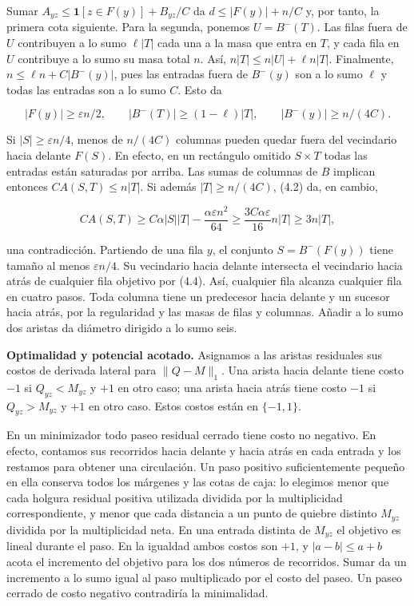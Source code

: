 \documentclass[spanish,11pt,a4paper]{article}
\begin{document}
Sumar \(A_{yz}\le\mathbf1[z\in F(y)]+B_{yz}/C\) da \(d\le |F(y)|+n/C\) y, por tanto, la primera cota siguiente. Para la segunda, ponemos \(U=B^-(T)\). Las filas fuera de \(U\) contribuyen a lo sumo \(\ell|T|\) cada una a la masa que entra en \(T\), y cada fila en \(U\) contribuye a lo sumo su masa total \(n\). Así, \(n|T|\le n|U|+\ell n|T|\). Finalmente, \(n\le\ell n+C|B^-(y)|\), pues las entradas fuera de \(B^-(y)\) son a lo sumo \(\ell\) y todas las entradas son a lo sumo \(C\). Esto da

\nopagebreak[4]
\[|F(y)|\ge\varepsilon n/2,\qquad
|B^-(T)|\ge(1-\ell)|T|,\qquad |B^-(y)|\ge n/(4C).\tag{4.4}\]

Si \(|S|\ge\varepsilon n/4\), menos de \(n/(4C)\) columnas pueden quedar fuera del vecindario hacia delante \(F(S)\). En efecto, en un rectángulo omitido \(S\times T\) todas las entradas están saturadas por arriba. Las sumas de columnas de \(B\) implican entonces \(CA(S,T)\le n|T|\). Si además \(|T|\ge n/(4C)\), (4.2) da, en cambio,

\nopagebreak[4]
\[CA(S,T)\ge C\alpha|S||T|-\frac{\alpha\varepsilon n^2}{64}
\ge\frac{3C\alpha\varepsilon}{16}n|T|\ge3n|T|,\tag{4.5}\]

una contradicción. Partiendo de una fila \(y\), el conjunto \(S=B^-(F(y))\) tiene tamaño al menos \(\varepsilon n/4\). Su vecindario hacia delante intersecta el vecindario hacia atrás de cualquier fila objetivo por (4.4). Así, cualquier fila alcanza cualquier fila en cuatro pasos. Toda columna tiene un predecesor hacia delante y un sucesor hacia atrás, por la regularidad y las masas de filas y columnas. Añadir a lo sumo dos aristas da diámetro dirigido a lo sumo seis.

\textbf{Optimalidad y potencial acotado.} Asignamos a las aristas residuales sus costos de derivada lateral para \(\|Q-M\|_1\). Una arista hacia delante tiene costo \(-1\) si \(Q_{yz}<M_{yz}\) y \(+1\) en otro caso; una arista hacia atrás tiene costo \(-1\) si \(Q_{yz}>M_{yz}\) y \(+1\) en otro caso. Estos costos están en \(\{-1,1\}\).

En un minimizador todo paseo residual cerrado tiene costo no negativo. En efecto, contamos sus recorridos hacia delante y hacia atrás en cada entrada y los restamos para obtener una circulación. Un paso positivo suficientemente pequeño en ella conserva todos los márgenes y las cotas de caja: lo elegimos menor que cada holgura residual positiva utilizada dividida por la multiplicidad correspondiente, y menor que cada distancia a un punto de quiebre distinto \(M_{yz}\) dividida por la multiplicidad neta. En una entrada distinta de \(M_{yz}\) el objetivo es lineal durante el paso. En la igualdad ambos costos son \(+1\), y \(|a-b|\le a+b\) acota el incremento del objetivo para los dos números de recorridos. Sumar da un incremento a lo sumo igual al paso multiplicado por el costo del paseo. Un paseo cerrado de costo negativo contradiría la minimalidad.
\end{document}
